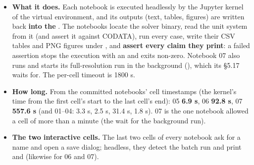 \begin{itemize}
  \item \textbf{What it does.} Each notebook is executed headlessly by the Jupyter kernel of the virtual environment, and its outputs (text, tables, figures) are written back \textbf{into the }. The notebooks locate the solver binary, read the unit system from it (and assert it against CODATA), run every case, write their CSV tables and PNG figures under , and \textbf{assert every claim they print}: a failed assertion stops the execution with an  and  exits non-zero. Notebook 07 also runs  and starts its full-resolution  run in the background (), which its \S{}5.17 waits for. The per-cell timeout is 1800 s.
  \item \textbf{How long.} From the committed notebooks' cell timestamps (the kernel's time from the first cell's start to the last cell's end): 05 \textbf{6.9 s}, 06 \textbf{92.8 s}, 07 \textbf{557.6 s} (and 01--04: 3.3 s, 2.5 s, 31.4 s, 1.8 s). 07 is the one notebook allowed a cell of more than a minute (the wait for the background run).
  \item \textbf{The two interactive cells.} The last two cells of every notebook ask for a name and open a save dialog; headless, they detect the batch run and print  and  (likewise for 06 and 07).

\end{itemize}
